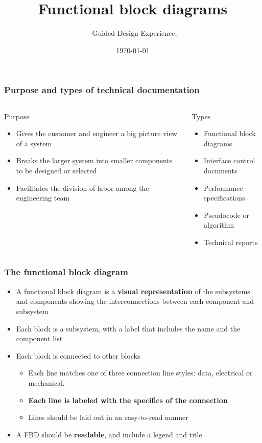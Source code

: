 \documentclass[aspectratio=169]{beamer}
\title{Functional block diagrams}
\subtitle{\usnaCourseNumber\ Guided Design Experience, \usnaCourseTerm}
\author{\usnaInstructorShort}
\date{\today}
\begin{document}
\settitlebg
\begin{frame}
\titlepage
\end{frame}

\setslidebg
\begin{frame}
\frametitle{Purpose and types of technical documentation}
\begin{columns}
\begin{column}{0.5\textwidth}
Purpose
\begin{itemize}
\item Gives the customer and engineer a big picture view of a system
\item Breaks the larger system into smaller components to be designed or selected
\item Facilitates the division of labor among the engineering team
\end{itemize}
\end{column}
\begin{column}{0.5\textwidth}
Types
\begin{itemize}
\item Functional block diagrams
\item Interface control documents
\item Performance specifications
\item Pseudocode or algorithm
\item Technical reports
\end{itemize}
\end{column}
\end{columns}
\end{frame}

\begin{frame}
\frametitle{The functional block diagram}
\begin{itemize}
\item A functional block diagram is a \textbf{visual representation} of the subsystems and components showing the interconnections between each component and subsystem
\item Each block is a subsystem, with a label that includes the name and the component list
\item Each block is connected to other blocks 
\begin{itemize}
\item Each line matches one of three connection line styles:  data, electrical or mechanical.
\item \textbf{Each line is labeled with the specifics of the connection}
\item Lines should be laid out in an easy-to-read manner
\end{itemize}
\item A FBD should be \textbf{readable}, and include a legend and title
\end{itemize}
\end{frame}
\end{document}
